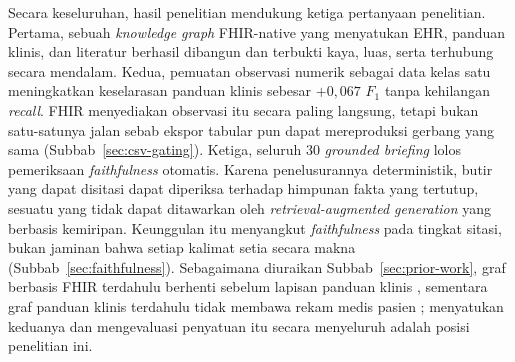 Secara keseluruhan, hasil penelitian mendukung ketiga pertanyaan penelitian. Pertama, sebuah
\emph{knowledge graph} FHIR-native yang menyatukan EHR, panduan klinis, dan literatur berhasil
dibangun dan terbukti kaya, luas, serta terhubung secara mendalam. Kedua, pemuatan observasi
numerik sebagai data kelas satu meningkatkan keselarasan panduan klinis sebesar $+0{,}067$
$F_1$ tanpa kehilangan \emph{recall}. FHIR menyediakan observasi itu secara paling langsung,
tetapi bukan satu-satunya jalan sebab ekspor tabular pun dapat mereproduksi gerbang yang
sama (Subbab~\ref{sec:csv-gating}). Ketiga, seluruh 30 \emph{grounded briefing} lolos
pemeriksaan \emph{faithfulness} otomatis. Karena penelusurannya deterministik, butir yang dapat
disitasi dapat diperiksa terhadap himpunan fakta yang tertutup, sesuatu yang tidak dapat
ditawarkan oleh \emph{retrieval-augmented generation} yang berbasis kemiripan. Keunggulan itu
menyangkut \emph{faithfulness} pada tingkat sitasi, bukan jaminan bahwa setiap kalimat setia
secara makna (Subbab~\ref{sec:faithfulness}). Sebagaimana diuraikan Subbab~\ref{sec:prior-work}, graf berbasis FHIR terdahulu
berhenti sebelum lapisan panduan klinis \cite{xiao2022}, sementara graf panduan klinis terdahulu tidak
membawa rekam medis pasien \cite{cui2025}; menyatukan keduanya dan mengevaluasi penyatuan itu
secara menyeluruh adalah posisi penelitian ini.

